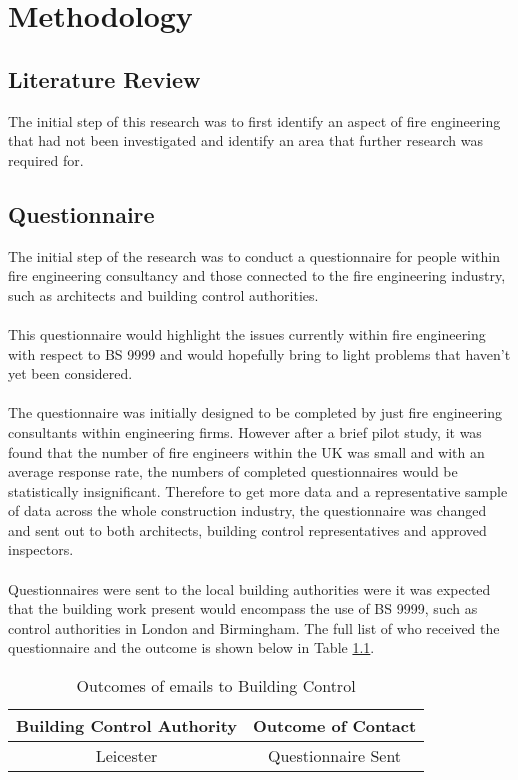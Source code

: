 \documentclass[a4paper,oneside]{book}
\begin{document}
\chapter{Methodology}
\section{Literature Review}
The initial step of this research was to first identify an aspect of fire engineering that had not been investigated and identify an area that further research was required for.
\section{Questionnaire}
The initial step of the research was to conduct a questionnaire for people within fire engineering consultancy and those connected to the fire engineering industry, such as architects and building control authorities.
\\
\\
This questionnaire would highlight the issues currently within fire engineering with respect to BS 9999 and would hopefully bring to light problems that haven't yet been considered.
\\
\\
The questionnaire was initially designed to be completed by just fire engineering consultants within engineering firms. However after a brief pilot study, it was found that the number of fire engineers within the UK was small and with an average response rate, the numbers of completed questionnaires would be statistically insignificant. Therefore to get  more data and a representative sample of data across the whole construction industry, the questionnaire was changed and sent out to both architects, building control representatives and approved inspectors.
\\
\\
Questionnaires were sent to the local building authorities were it was expected that the building work present would encompass the use of BS 9999, such as control authorities in London and Birmingham. The full list of who received the questionnaire and the outcome is shown below in Table \ref{tab:Build_Auth}.
\begin{table}
\begin{tabular}{|c|c|}
\hline
\textbf{Building Control Authority} & \textbf{Outcome of Contact} \\
\hline
Leicester & Questionnaire Sent \\
\hline
\end{tabular}
\caption{Outcomes of emails to Building Control}
\label{tab:Build_Auth}
\end{table}
\end{document}

